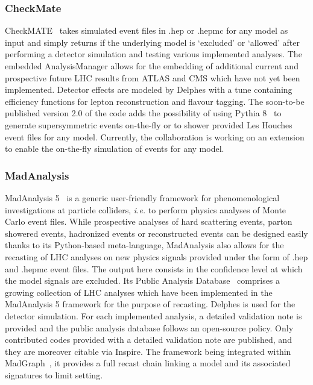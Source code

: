 \documentclass[11pt]{cernrep}
\begin{document}
\subsubsection{CheckMate}
CheckMATE~\cite{checkmate} takes simulated event files in .hep or .hepmc for any model as input and simply returns if the underlying model is `excluded' or `allowed' after
performing a detector simulation and testing various implemented analyses. The embedded AnalysisManager allows for the embedding of additional current and
prospective future LHC results from ATLAS and CMS which have not yet been implemented.
Detector effects are modeled by Delphes with a tune containing efficiency functions for lepton reconstruction and flavour tagging. The soon-to-be published version 2.0 of the code adds the possibility of using Pythia 8~\cite{pythia8} to
generate supersymmetric events on-the-fly or to shower provided Les Houches
event files for any model. Currently, the collaboration is working on an extension to enable the on-the-fly simulation of events for any model.


\subsubsection{MadAnalysis}
MadAnalysis 5~\cite{Conte:2012fm,Conte:2014zja} is a generic user-friendly
framework for phenomenological investigations at particle colliders, {\it i.e.}
to perform physics analyses of Monte Carlo event files. While prospective
analyses of hard scattering events, parton showered events, hadronized events or
reconstructed events can be designed easily thanks to its Python-based
meta-language, MadAnalysis also allows for the recasting of LHC analyses on new
physics signals provided under the form of .hep and .hepmc event files. The
output here consists in the confidence level at which the model signals are
excluded.
Its Public Analysis Database~\cite{Dumont:2014tja} comprises a growing
collection of LHC analyses which have been implemented in the MadAnalysis 5
framework for the purpose of recasting. Delphes is used for the detector
simulation. For each implemented analysis, a detailed validation note is
provided and the public analysis database follows an open-source policy. Only
contributed codes provided with a detailed validation note are published, and
they are moreover citable via Inspire. The framework being integrated within
MadGraph~\cite{Alwall:2014hca}, it provides a full recast chain linking a model
and its associated signatures to limit setting.
\end{document}
